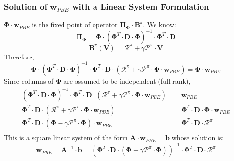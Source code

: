 \documentclass[handout]{beamer}
\newcommand{\bphi}{\bm{\Phi}}
\newcommand{\bb}{\bm{B}^{\pi}}
\newcommand{\bpi}{\bm{\Pi_{\Phi}}}
\newcommand{\bv}{\bm{V}}
\newcommand{\bd}{\bm{D}}
\newcommand{\brew}{\bm{\mathcal{R}}^{\pi}}
\newcommand{\bprob}{\bm{\mathcal{P}}^{\pi}}
\begin{document}
\begin{frame}
\frametitle{Solution of $\bm{w}_{PBE}$ with a Linear System Formulation}
\pause
$\bphi \cdot \bm{w}_{PBE}$ is the fixed point of operator $\bpi \cdot \bb$. We know:
$$\bpi = \bphi \cdot (\bphi^T \cdot \bd \cdot \bphi)^{-1} \cdot \bphi^T \cdot \bd$$
$$\bb (\bv) = \brew + \gamma \bprob \cdot \bv$$
\pause
Therefore,
$$\bphi \cdot (\bphi^T \cdot \bd \cdot \bphi)^{-1} \cdot \bphi^T \cdot \bd \cdot (\brew + \gamma \bprob \cdot \bphi \cdot \bm{w}_{PBE}) = \bphi \cdot \bm{w}_{PBE}$$
\pause
Since columns of $\bphi$ are assumed to be independent (full rank),
\begin{align*}
(\bphi^T \cdot \bd \cdot \bphi)^{-1} \cdot \bphi^T \cdot \bd \cdot (\brew + \gamma \bprob \cdot \bphi \cdot \bm{w}_{PBE}) & = \bm{w}_{PBE}\\
\bphi^T \cdot \bd \cdot (\brew + \gamma \bprob \cdot \bphi \cdot \bm{w}_{PBE}) &= \bphi^T \cdot \bd \cdot \bphi \cdot \bm{w}_{PBE}\\
\bphi^T \cdot \bd \cdot (\bphi - \gamma \bprob \cdot \bphi) \cdot \bm{w}_{PBE} &= \bphi^T \cdot \bd \cdot \brew\\ 
\end{align*}
\pause
This is a square linear system of the form $\bm{A} \cdot \bm{w}_{PBE} = \bm{b}$ whose solution is:
$$\bm{w}_{PBE} = \bm{A}^{-1} \cdot \bm{b} = (\bphi^T \cdot \bd \cdot (\bphi - \gamma \bprob \cdot \bphi))^{-1} \cdot \bphi^T \cdot \bd \cdot \brew$$
\end{frame}
\end{document}
